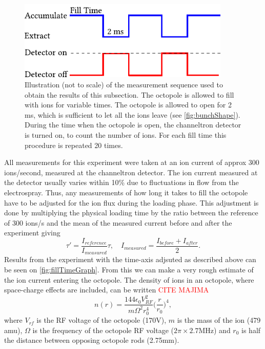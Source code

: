 \begin{figure}
    \centering
    \includegraphics[width = 0.9\textwidth]{main/StoragePulse.pdf}
    \caption{Illustration (not to scale) of the measurement sequence used to obtain the results of this subsection. The octopole is allowed to fill with ions for variable times. The octopole is allowed to open for 2 ms, which is sufficient to let all the ions leave (see \cref{fig:bunchShape}). During the time when the octopole is open,
    the channeltron detector is turned on, to count the number of ions. For each fill time this procedure is repeated 20 times.}
    \label{fig:storageSequence}
\end{figure}
All measurements for this experiment were taken at an ion current of approx 300 ions/second, measured at the channeltron detector.
The ion current measured at the detector usually varies within 10\% due to fluctuations in flow from the electrospray. Thus, any measurements of how long it takes to fill the octopole have to be adjusted for the ion flux during the loading phase.  This adjustment is done by multiplying the physical loading time by the ratio between the reference of 300 ions/s and the mean of the measured current before and after the experiment giving
\begin{equation}
    \tau'= \frac{I_{reference}}{I_{measured}}\tau,\quad I_{measured} = \frac{I_{before}+I_{after}}{2}.
\end{equation}
Results from the experiment with the time-axis adjsuted as described above can be seen on \cref{fig:fillTimeGraph}. From this we can make a very rough estimate of the ion current entering the octopole.
The density of ions in an octopole, where space-charge effects are included, can be written \textcolor{red}{CITE MAJIMA}
\begin{equation}
    n(r) = \frac{144\epsilon_0 V_{RF}^2}{m\Omega^2r_0^4}\bigg(\frac{r}{r_0}\bigg)^4,
\end{equation}
where $V_{rf}$ is the RF voltage of the octopole (170V), $m$ is the mass of the ion (479 amu), $\Omega$ is the frequency of the octopole RF voltage ($2\pi\times2.7$MHz) and $r_0$ is half the distance between opposing octopole rods (2.75mm).


